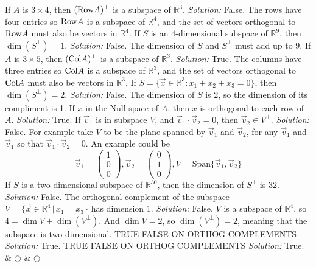      If $A$ is $3\times4$, then $(\text{Row} A)^{\perp}$ is a subspace of $\mathbb R^3$.   
    \ifnum {} {\color{DarkBlue} \textit{Solution:  } False. The rows have four entries so $\text{Row} A$ is a subspace of $\mathbb R^4$, and the set of vectors orthogonal to $\text{Row} A$ must also be vectors in $\mathbb R^4$.}  \fi
\fi     
\ifnum {}
  If $S$ is an $4$-dimensional subspace of $\mathbb R^9$, then $\dim(S^{\perp}) = 1$.
    \ifnum {} {\color{DarkBlue} \textit{Solution:  } False. The dimension of $S$ and $S^\perp$ must add up to $9$.  } \fi
\fi     
\ifnum {}
    If $A$ is $3\times5$, then $(\text{Col} A)^{\perp}$ is a subspace of $\mathbb R^3$.   
    \ifnum {} {\color{DarkBlue} \textit{Solution:  } True. The columns have three entries so $\text{Col} A$ is a subspace of $\mathbb R^3$, and the set of vectors orthogonal to $\text{Col} A$ must also be vectors in $\mathbb R^3$. } \fi
\fi     
\ifnum {}
    If $S = \{\vec x\in \mathbb R^3 \colon x_1+x_2+x_3 =0\}$, then $\dim (S^{\perp}) = 2$. 
    \ifnum {} {\color{DarkBlue} \textit{Solution:  } False. The dimension of $S$ is 2, so the dimension of its compliment is 1.    } \fi
\fi     
\ifnum {}
    If $x$ in the Null space of $A$, then $x$ is orthogonal to each row of $A$. 
    \ifnum {} {\color{DarkBlue} \textit{Solution:  } True.  } \fi
\fi   
\ifnum {}
    If $ \vec v_1$ is in subspace $V$, and $\vec v_1 \cdot \vec v_2 =0$, then $ \vec v_2 \in V ^{\perp}$. 
    \ifnum {} {\color{DarkBlue} \textit{Solution:  } False. For example take $V$ to be the plane spanned by $\vec v_1$ and $\vec v_2$, for any $ \vec v_1$ and $ \vec v_1$ so that $\vec v_1 \cdot \vec v_2 =0$. An example could be $$\vec v_1 = \begin{pmatrix} 1\\0\\0\end{pmatrix}, \vec v_2 = \begin{pmatrix} 0\\1\\0\end{pmatrix} , V = \text{Span}\{\vec v_1, \vec v_2\}$$ }  \fi
\fi   
\ifnum {}
    If $S$ is a two-dimensional subspace of $\mathbb R^{30}$, then the dimension of  $S^{\perp}$ is 32.
    \ifnum {} {\color{DarkBlue} \textit{Solution:  } False.  } \fi
\fi   
\ifnum {}
    The orthogonal complement of the subspace $V = \{ \vec x \in \mathbb R^4 \, | \, x_1 = x_3 \}$ has dimension 1. 
    \ifnum {} {\color{DarkBlue} \textit{Solution:  } False. $V$ is a subspace of $\mathbb R^4$, so $4 = \dim V + \dim(V^{\perp})$. And $\dim V = 2$, so $\dim( V^{\perp})=2$, meaning that the subspace is  two dimensional.} \fi
\fi   
\ifnum {}
    TRUE FALSE ON ORTHOG COMPLEMENTS 
    \ifnum {} {\color{DarkBlue} \textit{Solution:  } True.  } \fi
\fi   
\ifnum {}
    TRUE FALSE ON ORTHOG COMPLEMENTS 
    \ifnum {} {\color{DarkBlue} \textit{Solution:  } True.  } \fi
\fi   
& $\bigcirc$  & $\bigcirc$ \\   